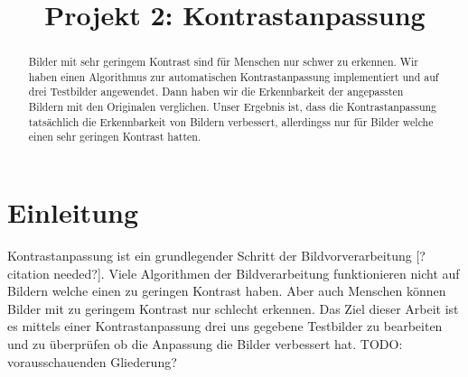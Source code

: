 \documentclass[conference,a4paper, 11pt]{IEEEtran}
\begin{document}
%
\title{Projekt 2: Kontrastanpassung}


\author{
}

\maketitle

\begin{abstract}
	Bilder mit sehr geringem Kontrast sind für Menschen nur schwer zu erkennen. Wir haben einen Algorithmus zur automatischen Kontrastanpassung implementiert und auf drei Testbilder angewendet. Dann haben wir die Erkennbarkeit der angepassten Bildern mit den Originalen verglichen.
  Unser Ergebnis ist, dass die Kontrastanpassung tatsächlich die Erkennbarkeit von Bildern verbessert, allerdingss nur für Bilder welche einen sehr geringen Kontrast hatten.
\end{abstract}





%
\IEEEpeerreviewmaketitle



\section{Einleitung}
Kontrastanpassung ist ein grundlegender Schritt der Bildvorverarbeitung [?citation needed?].
Viele Algorithmen der Bildverarbeitung funktionieren nicht auf Bildern welche einen zu geringen Kontrast haben. Aber auch Menschen können Bilder mit zu geringem Kontrast nur schlecht erkennen. Das Ziel dieser Arbeit ist es mittels einer Kontrastanpassung drei uns gegebene Testbilder zu bearbeiten und zu überprüfen ob die Anpassung die Bilder verbessert hat.
TODO: vorausschauenden Gliederung?
\end{document}
